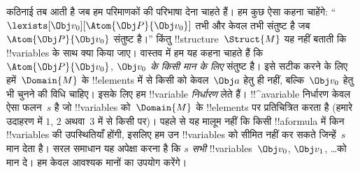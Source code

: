 \documentclass[../../../include/open-logic-section]{subfiles}
\begin{document}
कठिनाई तब आती है जब हम परिमाणकों की परिभाषा देना चाहते हैं। हम कुछ ऐसा
कहना चाहेंगे: ``$\lexists[\Obj
v_0][\Atom{\Obj P}{\Obj v_0}]$ तभी और केवल तभी संतुष्ट है जब
$\Atom{\Obj P}{\Obj
v_0}$ संतुष्ट है।'' किंतु !!{structure}~$\Struct{M}$ यह नहीं बताती कि
!!{variable}s के साथ क्या किया जाए। वास्तव में हम यह कहना चाहते हैं कि
$\Atom{\Obj P}{\Obj v_0}$, \emph{$\Obj v_0$ के किसी मान के लिए} संतुष्ट है।
इसे सटीक करने के लिए हमें~$\Domain{M}$ के !!{element}s में से किसी को केवल~$\Obj a$ हेतु ही
नहीं, बल्कि~$\Obj
v_0$ हेतु भी चुनने की विधि चाहिए। इसके लिए हम !!{variable}
\emph{निर्धारण} लेते हैं। !!^a{variable} निर्धारण केवल ऐसा फलन~$s$ है जो
!!{variable}s को~$\Domain{M}$ के !!{element}s पर प्रतिचित्रित करता है (हमारे
उदाहरण में $1$, $2$ अथवा~$3$ में से किसी पर)। पहले से यह मालूम नहीं कि किसी
!!a{formula} में किन !!{variable}s की उपस्थितियाँ होंगी, इसलिए हम उन !!{variable}s को
सीमित नहीं कर सकते जिन्हें~$s$ मान देता है। सरल समाधान यह अपेक्षा करना है कि
$s$ \emph{सभी} !!{variable}s~$\Obj
v_0$, $\Obj v_1$, \dots\@ को मान दे। हम केवल आवश्यक मानों का उपयोग करेंगे।
\end{document}
